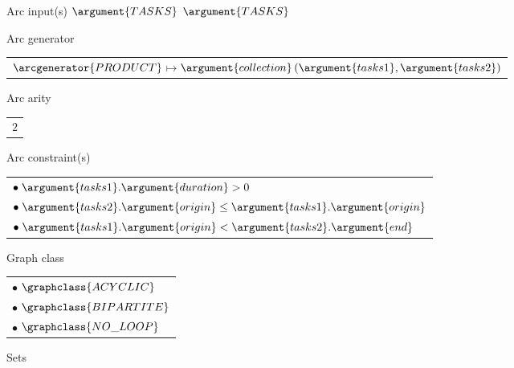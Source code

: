 \begin{ctrdesc}
{\begin{minipage}[t]{11.2cm}
\end{minipage}}
\colorbox{MyAzurelight}{\begin{minipage}[t]{11.2cm}
\item[Arc input(s)]
$\argument{TASKS}$ 
$\argument{TASKS}$
\item[Arc generator]
\begin{tabular}[t]{l}
$ $\hyperlink{AG_PRODUCT}{$\arcgenerator{PRODUCT}$}$ \mapsto  $\hyperlink{DT_collection}{$\argument{collection}$}$ (\argument{tasks1},\argument{tasks2})$\\
\end{tabular}
\item[Arc arity]
\begin{tabular}[t]{l}
$2$\\
\end{tabular}
\item[Arc constraint(s)]
\begin{tabular}[t]{l}
$\bullet\; \argument{tasks1}.\argument{duration}>0$\\
$\bullet\; \argument{tasks2}.\argument{origin}\leq \argument{tasks1}.\argument{origin}$\\
$\bullet\; \argument{tasks1}.\argument{origin}<\argument{tasks2}.\argument{end}$\\
\end{tabular}
\item[Graph class]
\begin{tabular}[t]{l}
$\bullet\;  $\hyperlink{GC_ACYCLIC}{$\graphclass{ACYCLIC}$}$ $\\
$\bullet\;  $\hyperlink{GC_BIPARTITE}{$\graphclass{BIPARTITE}$}$ $\\
$\bullet\;  $\hyperlink{GC_NO_LOOP}{$\graphclass{NO\_LOOP}$}$ $\\
\end{tabular}
\item[Sets]
\begin{tabular}[t]{l}
$\begin{array}[t]{l}
\setgenerator{SUCC}\mapsto \\
\left[\begin{array}{l}
\argument{source},
\\\argument{variables}-\argument{col}\left(\begin{array}{l}

\end{array}
\end{array}
\end{array}
\end{tabular}
\end{minipage}}
\end{ctrdesc}
